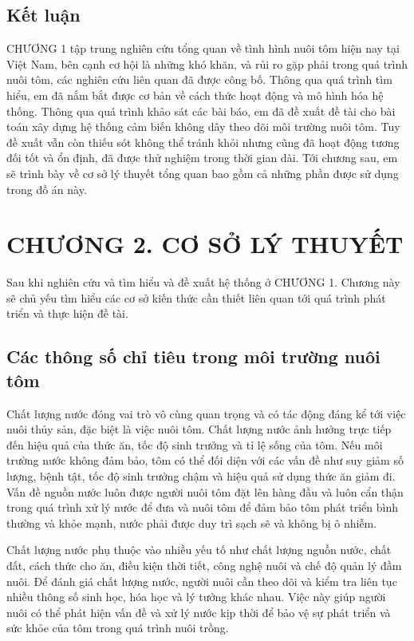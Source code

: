 \documentclass{article} %
\begin{document}
	\subsection{Kết luận}
	
	CHƯƠNG 1 tập trung nghiên cứu tổng quan về tình hình nuôi tôm hiện nay tại Việt Nam, bên cạnh cơ hội là những khó khăn, và rủi ro gặp phải trong quá trình nuôi tôm, các nghiên cứu liên quan đã được công bố. Thông qua quá trình tìm hiểu, em đã nắm bắt được cơ bản về cách thức hoạt động và mô hình hóa hệ thống. Thông qua quá trình khảo sát các bài báo, em đã đề xuất đề tài cho bài toán xây dựng hệ thống cảm biến không dây theo dõi môi trường nuôi tôm. Tuy đề xuất vẫn còn thiếu sót không thể tránh khỏi nhưng cũng đã hoạt động tương đối tốt và ổn định, đã được thử nghiệm trong thời gian dài. Tới chương sau, em sẽ trình bày về cơ sở lý thuyết tổng quan bao gồm cả những phần được sử dụng trong đồ án này.
    
	
	\newpage
	\section*{CHƯƠNG 2.  CƠ SỞ LÝ THUYẾT}
	\setcounter{section}{2}
    \setcounter{subsection}{0}
	\setcounter{figure}{0}
	\setcounter{table}{0}
	
	Sau khi nghiên cứu và tìm hiểu và đề xuất hệ thống ở CHƯƠNG 1. Chương này sẽ chủ yếu tìm hiểu các cơ sở kiến thức cần thiết liên quan tới quá trình phát triển và thực hiện đề tài.
	
	
	\subsection{Các thông số chỉ tiêu trong môi trường nuôi tôm}
	
	Chất lượng nước đóng vai trò vô cùng quan trọng và có tác động đáng kể tới việc nuôi thủy sản, đặc biệt là việc nuôi tôm. Chất lượng nước ảnh hưởng trực tiếp đến hiệu quả của thức ăn, tốc độ sinh trưởng và tỉ lệ sống của tôm. Nếu môi trường nước không đảm bảo, tôm có thể đối diện với các vấn đề như suy giảm số lượng, bệnh tật, tốc độ sinh trưởng chậm và hiệu quả sử dụng thức ăn giảm đi. Vấn đề nguồn nước luôn được người nuôi tôm đặt lên hàng đầu và luôn cẩn thận trong quá trình xử lý nước để đưa và nuôi tôm để đảm bảo tôm phát triển bình thường và khỏe mạnh, nước phải được duy trì sạch sẽ và không bị ô nhiễm.
	
	Chất lượng nước phụ thuộc vào nhiều yếu tố như chất lượng nguồn nước, chất đất, cách thức cho ăn, điều kiện thời tiết, công nghệ nuôi và chế độ quản lý đầm nuôi. Để đánh giá chất lượng nước, người nuôi cần theo dõi và kiểm tra liên tục nhiều thông số sinh học, hóa học và lý tưởng khác nhau. Việc này giúp người nuôi có thể phát hiện vấn đề và xử lý nước kịp thời để bảo vệ sự phát triển và sức khỏe của tôm trong quá trình nuôi trồng.
	
\end{document}
